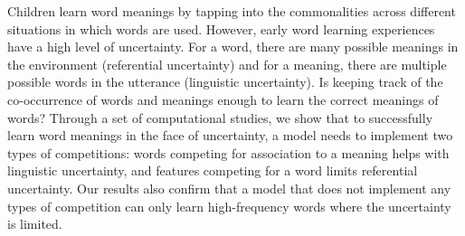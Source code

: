 Children learn word meanings by tapping into the commonalities across different situations in which words are used. However, early word learning experiences have a high level of uncertainty. For a word, there are many possible meanings in the environment (referential uncertainty) and for a meaning, there are multiple possible words in the utterance (linguistic uncertainty). Is keeping track of the co-occurrence of words and meanings enough to learn the correct meanings of words? Through a set of computational studies, we show that to successfully learn word meanings in the face of uncertainty, a model needs to implement two types of competitions: words competing for association to a meaning helps with linguistic uncertainty, and features competing for a word limits referential uncertainty. Our results also confirm that a model that does not implement any types of competition can only learn high-frequency words where the uncertainty is limited.
